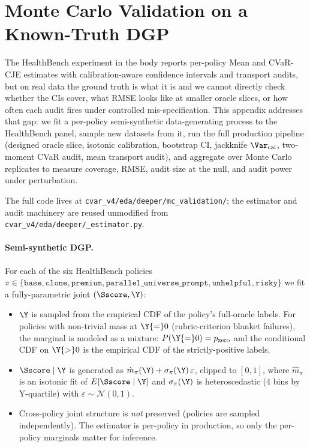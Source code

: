 \section{Monte Carlo Validation on a Known-Truth DGP}
\label{app:mc-validation}

The HealthBench experiment in the body reports per-policy Mean and CVaR-CJE
estimates with calibration-aware confidence intervals and transport audits,
but on real data the ground truth is what it is and we cannot directly check
whether the CIs cover, what RMSE looks like at smaller oracle slices, or how
often each audit fires under controlled mis-specification. This appendix
addresses that gap: we fit a per-policy semi-synthetic data-generating
process to the HealthBench panel, sample new datasets from it, run the full
production pipeline (designed oracle slice, isotonic calibration, bootstrap
CI, jackknife $\Var_{\text{cal}}$, two-moment CVaR audit, mean transport
audit), and aggregate over Monte Carlo replicates to measure coverage,
RMSE, audit size at the null, and audit power under perturbation.

The full code lives at \texttt{cvar\_v4/eda/deeper/mc\_validation/}; the
estimator and audit machinery are reused unmodified from
\texttt{cvar\_v4/eda/deeper/\_estimator.py}.

\paragraph{Semi-synthetic DGP.}
For each of the six HealthBench policies $\pi \in \{\texttt{base},
\texttt{clone}, \texttt{premium}, \texttt{parallel\_universe\_prompt},
\texttt{unhelpful}, \texttt{risky}\}$ we fit a fully-parametric joint
$(\Sscore, \Y)$:
\begin{itemize}[leftmargin=*,nosep]
  \item $\Y$ is sampled from the empirical CDF of the policy's full-oracle
    labels. For policies with non-trivial mass at $\Y{=}0$
    (rubric-criterion blanket failures), the marginal is modeled as a
    mixture: $P(\Y{=}0)=p_{\text{zero}}$ and the conditional CDF on
    $\Y{>}0$ is the empirical CDF of the strictly-positive labels.
  \item $\Sscore \mid \Y$ is generated as $\hat m_\pi(\Y) + \sigma_\pi(\Y)\,\varepsilon$,
    clipped to $[0, 1]$, where $\hat m_\pi$ is an isotonic fit of $E[\Sscore \mid \Y]$
    and $\sigma_\pi(\Y)$ is heteroscedastic (4 bins by Y-quartile) with $\varepsilon \sim \mathcal{N}(0, 1)$.
  \item Cross-policy joint structure is \emph{not} preserved (policies are
    sampled independently). The estimator is per-policy in production, so
    only the per-policy marginals matter for inference.
\end{itemize}

